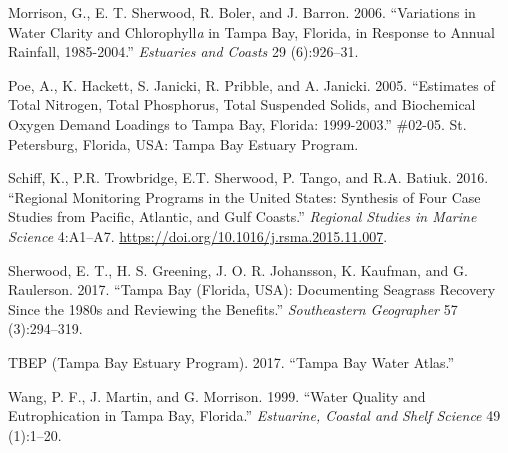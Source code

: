 \documentclass[]{article}
\begin{document}
\leavevmode\hypertarget{ref-Morrison06}{}%
Morrison, G., E. T. Sherwood, R. Boler, and J. Barron. 2006.
``Variations in Water Clarity and Chlorophyll\emph{a} in Tampa Bay,
Florida, in Response to Annual Rainfall, 1985-2004.'' \emph{Estuaries
and Coasts} 29 (6):926--31.

\leavevmode\hypertarget{ref-Poe05}{}%
Poe, A., K. Hackett, S. Janicki, R. Pribble, and A. Janicki. 2005.
``Estimates of Total Nitrogen, Total Phosphorus, Total Suspended Solids,
and Biochemical Oxygen Demand Loadings to Tampa Bay, Florida:
1999-2003.'' \#02-05. St. Petersburg, Florida, USA: Tampa Bay Estuary
Program.

\leavevmode\hypertarget{ref-Schiff16}{}%
Schiff, K., P.R. Trowbridge, E.T. Sherwood, P. Tango, and R.A. Batiuk.
2016. ``Regional Monitoring Programs in the United States: Synthesis of
Four Case Studies from Pacific, Atlantic, and Gulf Coasts.''
\emph{Regional Studies in Marine Science} 4:A1--A7.
\url{https://doi.org/10.1016/j.rsma.2015.11.007}.

\leavevmode\hypertarget{ref-Sherwood17}{}%
Sherwood, E. T., H. S. Greening, J. O. R. Johansson, K. Kaufman, and G.
Raulerson. 2017. ``Tampa Bay (Florida, USA): Documenting Seagrass
Recovery Since the 1980s and Reviewing the Benefits.''
\emph{Southeastern Geographer} 57 (3):294--319.

\leavevmode\hypertarget{ref-TBEP17}{}%
TBEP (Tampa Bay Estuary Program). 2017. ``Tampa Bay Water Atlas.''

\leavevmode\hypertarget{ref-Wang99}{}%
Wang, P. F., J. Martin, and G. Morrison. 1999. ``Water Quality and
Eutrophication in Tampa Bay, Florida.'' \emph{Estuarine, Coastal and
Shelf Science} 49 (1):1--20.
\end{document}
